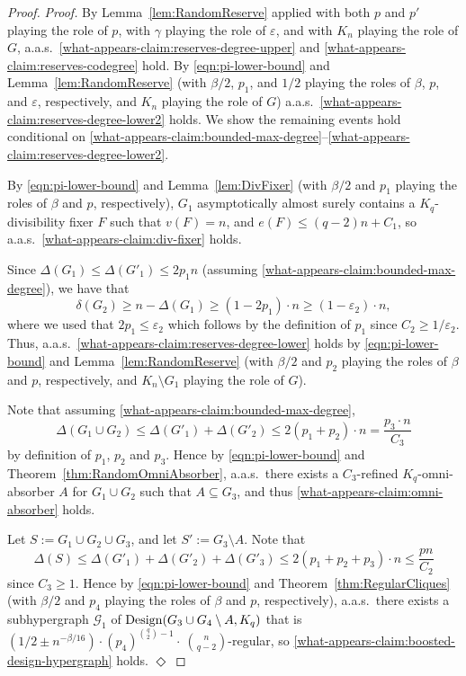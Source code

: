 \documentclass[11pt]{article}
\def\COMMENT#1{}
\numberwithin{equation}{section}
\newcommand{\eps}{\varepsilon}
\newcommand{\mc}[1]{\mathcal{#1}}
\newcounter{i}
\theoremstyle{plain}
\newenvironment{proofclaim}[1][]%
{\noindent \emph{Proof.} {}{#1}{}}{\hfill
	$\Diamond$\vspace{1em}}
\theoremstyle{plain} %
\theoremstyle{definition}
\newcommand{\aas}{a.a.s.\ }
\begin{document}
\begin{proof}
\begin{proofclaim}
  By Lemma~\ref{lem:RandomReserve} applied with both $p$ and $p'$ playing the role of $p$, with $\gamma$ playing the role of $\eps$, and with $K_n$ playing the role of $G$, \aas \ref{what-appears-claim:reserves-degree-upper} and \ref{what-appears-claim:reserves-codegree} hold. %
  By \eqref{eqn:pi-lower-bound} and Lemma~\ref{lem:RandomReserve} (with $\beta / 2$, $p_1$, and $1/2$ playing the roles of $\beta$,  $p$, and $\eps$, respectively, and $K_n$ playing the role of $G$) \aas \ref{what-appears-claim:reserves-degree-lower2} holds.
  We show the remaining events hold conditional on \ref{what-appears-claim:bounded-max-degree}--\ref{what-appears-claim:reserves-degree-lower2}.
  
  By \eqref{eqn:pi-lower-bound} and Lemma~\ref{lem:DivFixer} (with $\beta/2$ and $p_1$ playing the roles of $\beta$ and $p$, respectively), $G_1$ asymptotically almost surely  contains a $K_q$-divisibility fixer $F$ such that $v(F) = n$, and $e(F) \le (q-2)n + C_1$, so \aas \ref{what-appears-claim:div-fixer} holds.

  

  Since $\Delta(G_1) \leq \Delta(G'_1) \leq 2p_1 n$ (assuming \ref{what-appears-claim:bounded-max-degree}), we have that 
$$\delta(G_2) \ge n-\Delta(G_1) \ge (1-2p_1)\cdot n \ge (1-\varepsilon_2)\cdot n,$$
where we used that $2p_1\le \varepsilon_2$ which follows by the definition of $p_1$ since $C_2 \ge {1}/{\varepsilon_2}$. 
Thus, \aas \ref{what-appears-claim:reserves-degree-lower} holds by \eqref{eqn:pi-lower-bound} and Lemma~\ref{lem:RandomReserve} (with $\beta / 2$ and $p_2$ playing the roles of $\beta$ and $p$, respectively, and $K_n \setminus G_1$ playing the role of $G$).  

Note that assuming \ref{what-appears-claim:bounded-max-degree},
$$\Delta(G_1 \cup G_2)\le \Delta(G'_1)+\Delta(G'_2) \le 2(p_1+p_2)\cdot n = \frac{p_3\cdot n}{C_3}$$
by definition of $p_1$, $p_2$ and $p_3$. Hence by \eqref{eqn:pi-lower-bound} and Theorem~\ref{thm:RandomOmniAbsorber}, \aas there exists a $C_3$-refined $K_q$-omni-absorber $A$ for $G_1 \cup G_2$ such that $A \subseteq G_3$, and thus \ref{what-appears-claim:omni-absorber} holds.

Let $S:= G_1 \cup G_2 \cup G_3$, and let $S':= G_3\setminus A$.  Note that 
$$\Delta(S) \le \Delta(G'_1) + \Delta(G'_2) + \Delta(G'_3) \leq 2(p_1+p_2+p_3)\cdot n\le \frac{pn}{C_2}$$
since $C_3\ge 1$. 
Hence by \eqref{eqn:pi-lower-bound} and Theorem~\ref{thm:RegularCliques} (with $\beta / 2$ and $p_4$ playing the roles of $\beta$ and $p$, respectively), \aas there exists a subhypergraph $\mc{G}_1$ of ${\rm Design}(G_3 \cup G_4 \setminus A,K_q)$ that is $\left(1/2\pm n^{-\beta/16}\right)\cdot (p_4)^{\binom{q}{2}-1}\cdot~\binom{n}{q-2}$-regular, so \ref{what-appears-claim:boosted-design-hypergraph} holds.
\end{proofclaim}


\end{proof}
\end{document}

